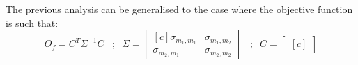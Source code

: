 The previous analysis can be generalised to the case where the objective function is such that:
\begin{equation*}
    O_f = C^T \Sigma^{-1} C \; \; \; ; \; \;
        \Sigma=
    \begin{bmatrix}[c]
        \sigma_{m_1,m_1}    & \sigma_{m_1,m_2} \\
        \sigma_{m_2,m_1}    & \sigma_{m_2,m_2}
    \end{bmatrix}
    \;\;\; ; \; \; C = 
    \begin{bmatrix}[c]
        
    \end{bmatrix}
\end{equation*}